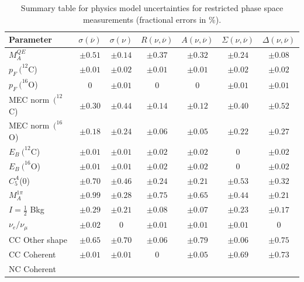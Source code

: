 \begin{table}
\caption{
\label{tab:PhysicsModelPiFSISummary}
Summary table for physics model uncertainties for restricted
phase space measurements (fractional errors in $\%$).
}

\begin{tabular}{lcccccc}
\hline
\hline
Parameter & 
$\sigma(\overline{\nu})$ & $\sigma(\nu)$ & $R (\nu,\overline{\nu})$ & $A(\nu,\overline{\nu})$ & $\Sigma(\nu,\overline{\nu})$ & $\Delta (\nu,\overline{\nu})$ \\
\hline
$M^{QE}_A$ 
& $\pm0.51$ & $\pm0.14$ & $\pm0.37$ & $\pm0.32$ & $\pm0.24$ & $\pm0.08$ \\
$p_F\ (^{12}$C) 
& $\pm0.01$ & $\pm0.02$ & $\pm0.01$ & $\pm0.01$ & $\pm0.02$ & $\pm0.02$ \\
$p_F\ (^{16}$O) 
& $0$ & $\pm0.01$ & $0$ & $0$ & $\pm0.01$ & $\pm0.01$ \\
MEC norm\ $(^{12}$C) 
& $\pm0.30$ & $\pm0.44$ & $\pm0.14$ & $\pm0.12$ & $\pm0.40$ & $\pm0.52$ \\
MEC norm\ $(^{16}$O) 
& $\pm0.18$ & $\pm0.24$ & $\pm0.06$ & $\pm0.05$ & $\pm0.22$ & $\pm0.27$ \\
$E_B\ (^{12}$C) 
& $\pm0.01$ & $\pm0.01$ & $\pm0.02$ & $\pm0.02$ & $0$ & $\pm0.02$ \\
$E_B\ (^{16}$O) 
& $\pm0.01$ & $\pm0.01$ & $\pm0.02$ & $\pm0.02$ & $0$ & $\pm0.02$ \\
$C_5^A$(0) 
& $\pm0.70$ & $\pm0.46$ & $\pm0.24$ & $\pm0.21$ & $\pm0.53$ & $\pm0.32$ \\
$M_A^{1\pi}$ 
& $\pm0.99$ & $\pm0.28$ & $\pm0.75$ & $\pm0.65$ & $\pm0.44$ & $\pm0.21$ \\
$I=\frac{1}{2}$ Bkg 
& $\pm0.29$ & $\pm0.21$ & $\pm0.08$ & $\pm0.07$ & $\pm0.23$ & $\pm0.17$ \\
$\nu_e/\nu_{\mu}$
& $\pm0.02$ & $0$ & $\pm0.01$ & $\pm0.01$ & $\pm0.01$ & $0$   \\
CC Other shape 
& $\pm0.65$ & $\pm0.70$ & $\pm0.06$ & $\pm0.79$ & $\pm0.06$ & $\pm0.75$ \\
CC Coherent 
& $\pm0.01$ & $\pm0.01$ & $0$ & $\pm0.05$ & $\pm0.69$ & $\pm0.73$ \\
NC Coherent 

\end{tabular}
\end{table}
